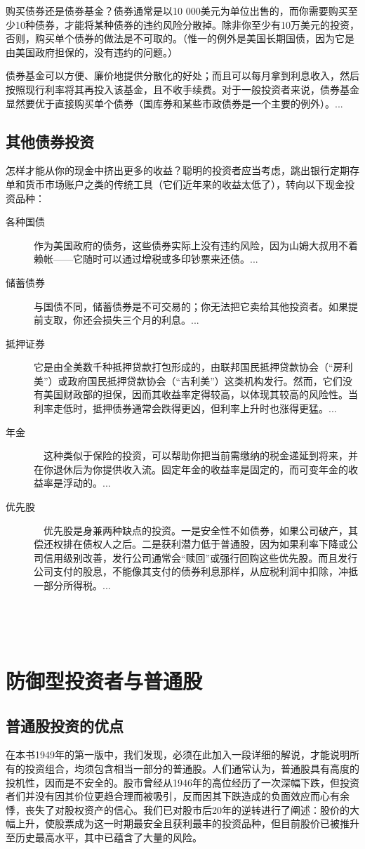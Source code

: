 \documentclass[12pt,oneside]{book}
\begin{document}
购买债券还是债券基金？债券通常是以10 000美元为单位出售的，而你需要购买至少10种债券，才能将某种债券的违约风险分散掉。除非你至少有10万美元的投资，否则，购买单个债券的做法是不可取的。（惟一的例外是美国长期国债，因为它是由美国政府担保的，没有违约的问题。）

债券基金可以方便、廉价地提供分散化的好处；而且可以每月拿到利息收入，然后按照现行利率将其再投入该基金，且不收手续费。对于一般投资者来说，债券基金显然要优于直接购买单个债券（国库券和某些市政债券是一个主要的例外）。...


\subsection{其他债券投资}
怎样才能从你的现金中挤出更多的收益？聪明的投资者应当考虑，跳出银行定期存单和货币市场账户之类的传统工具（它们近年来的收益太低了），转向以下现金投资品种：

\begin{description}
\item[各种国债] 作为美国政府的债务，这些债券实际上没有违约风险，因为山姆大叔用不着赖帐——它随时可以通过增税或多印钞票来还债。...
\item[储蓄债券] 与国债不同，储蓄债券是不可交易的；你无法把它卖给其他投资者。如果提前支取，你还会损失三个月的利息。...
\item[抵押证券] 它是由全美数千种抵押贷款打包形成的，由联邦国民抵押贷款协会（“房利美”）或政府国民抵押贷款协会（“吉利美”）这类机构发行。然而，它们没有美国财政部的担保，因而其收益率定得较高，以体现其较高的风险性。当利率走低时，抵押债券通常会跌得更凶，但利率上升时也涨得更猛。...

\item[年金]　这种类似于保险的投资，可以帮助你把当前需缴纳的税金递延到将来，并在你退休后为你提供收入流。固定年金的收益率是固定的，而可变年金的收益率是浮动的。...

\item[优先股]　优先股是身兼两种缺点的投资。一是安全性不如债券，如果公司破产，其偿还权排在债权人之后。二是获利潜力低于普通股，因为如果利率下降或公司信用级别改善，发行公司通常会“赎回”或强行回购这些优先股。而且发行公司支付的股息，不能像其支付的债券利息那样，从应税利润中扣除，冲抵一部分所得税。...
\end{description}

　

　
\section{防御型投资者与普通股}
\subsection{普通股投资的优点}
在本书1949年的第一版中，我们发现，必须在此加入一段详细的解说，才能说明所有的投资组合，均须包含相当一部分的普通股。人们通常认为，普通股具有高度的投机性，因而是不安全的。股市曾经从1946年的高位经历了一次深幅下跌，但投资者们并没有因其价位更趋合理而被吸引，反而因其下跌造成的负面效应而心有余悸，丧失了对股权资产的信心。我们已对股市后20年的逆转进行了阐述：股价的大幅上升，使股票成为这一时期最安全且获利最丰的投资品种，但目前股价已被推升至历史最高水平，其中已蕴含了大量的风险。
\end{document}
